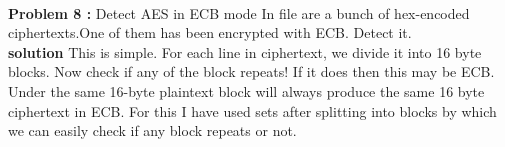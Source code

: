 \documentclass[12pt]{assignment}
\begin{document}
    \\

    \textbf{Problem 8 :}
    Detect AES in ECB mode
    In file are a bunch of hex-encoded ciphertexts.One of them has been encrypted with ECB. Detect it.\\
    
    
    \textbf{solution}
    This is simple. For each line in ciphertext, we divide it into 16 byte blocks. Now check if any of the block repeats! If it does then this may be ECB. Under the same 16-byte plaintext block will always produce the same 16 byte ciphertext in ECB. For this I have used sets after splitting into blocks by which we can easily check if any block repeats or not.
    
\end{document}
